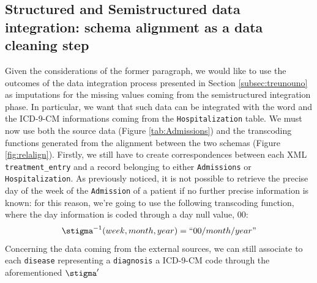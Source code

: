 \subsection{Structured and Semistructured data integration: schema alignment as a data cleaning step}\label{subsec:datacleaningintegrate}
Given the considerations of the former paragraph, we would like to use the outcomes of the data integration process presented in Section \ref{subsec:treunouno} as imputations for %
the missing values coming from the semistructured  integration phase. In particular, we want that such data can be integrated with the word and the ICD-9-CM informations coming from the \texttt{Hospitalization} table.
We must now use both the source data (Figure \vref{tab:Admissions}) and the transcoding functions generated from the alignment between the two schemas (Figure \vref{fig:relalign}). Firstly, we still have to create correspondences between each XML \texttt{treatment\_entry} and a record belonging to either \texttt{Admissions} or \texttt{Hospitalization}.%
 As previously noticed, it is not possible to retrieve the precise day of the week of the \texttt{Admission} of a patient if no further precise information is known: for this reason, we're going to use the following transcoding function, where the day information is coded through a day null value, $00$:
\begin{equation*}
\transcoding^{-1}(week,month,year)=\textup{``}00/month/year\textup{''}
\end{equation*}
Concerning the data coming from the external sources, we can still associate to each \texttt{disease} representing a \texttt{diagnosis} a ICD-9-CM code through the aforementioned $\transcoding'$

